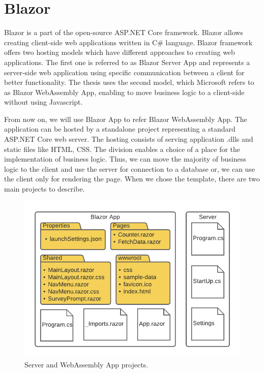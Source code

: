 \section{Blazor}

Blazor is a part of the open-source ASP.NET Core framework.
Blazor allows creating client-side web applications written in C\# language.
Blazor framework offers two hosting models \cite{online:hostingModels} which have different approaches to creating web applications. 
The first one is referred to as Blazor Server App and represents a server-side web application using specific communication between a client for better functionality.
The thesis uses the second model, which Microsoft refers to as Blazor WebAssembly App, enabling to move business logic to a client-side without using Javascript.
\par
From now on, we will use Blazor App to refer Blazor WebAssembly App.
The application can be hosted by a standalone project representing a standard ASP.NET Core web server.
The hosting consists of serving application .dlls and static files like HTML, CSS.
The division enables a choice of a place for the implementation of business logic.
Thus, we can move the majority of business logic to the client and use the server for connection to a database or, we can use the client only for rendering the page.
When we chose the template, there are two main projects to describe.
\par
\begin{figure}[!b]\centering
\includegraphics{./img/ProjectStructure}
\caption{Server and WebAssembly App projects.}
\label{img04:projects}
\end{figure} 
